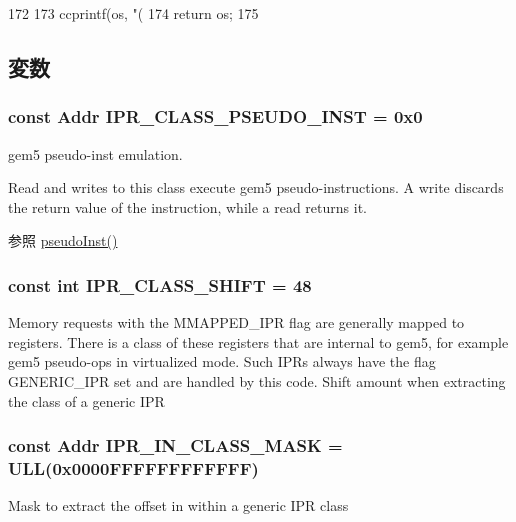 \begin{DoxyCode}
172 {
173     ccprintf(os, "(%
174     return os;
175 }
\end{DoxyCode}


\subsection{変数}
\hypertarget{namespaceGenericISA_a7691200ba0d3fea3d1bfdc555efb9b76}{
\subsubsection[{IPR\_\-CLASS\_\-PSEUDO\_\-INST}]{\setlength{\rightskip}{0pt plus 5cm}const {\bf Addr} {\bf IPR\_\-CLASS\_\-PSEUDO\_\-INST} = 0x0}}
\label{namespaceGenericISA_a7691200ba0d3fea3d1bfdc555efb9b76}
gem5 pseudo-\/inst emulation.

Read and writes to this class execute gem5 pseudo-\/instructions. A write discards the return value of the instruction, while a read returns it.

\begin{DoxySeeAlso}{参照}
\hyperlink{namespacePseudoInst_a469ba8e314952a0076e086dee22ea6de}{pseudoInst()} 
\end{DoxySeeAlso}
\hypertarget{namespaceGenericISA_aeb17d164394fbbccc6ef6992f36e9a74}{
\subsubsection[{IPR\_\-CLASS\_\-SHIFT}]{\setlength{\rightskip}{0pt plus 5cm}const int {\bf IPR\_\-CLASS\_\-SHIFT} = 48}}
\label{namespaceGenericISA_aeb17d164394fbbccc6ef6992f36e9a74}
Memory requests with the MMAPPED\_\-IPR flag are generally mapped to registers. There is a class of these registers that are internal to gem5, for example gem5 pseudo-\/ops in virtualized mode. Such IPRs always have the flag GENERIC\_\-IPR set and are handled by this code. Shift amount when extracting the class of a generic IPR \hypertarget{namespaceGenericISA_ada17fbe3666ca6de3621618e5abf7791}{
\subsubsection[{IPR\_\-IN\_\-CLASS\_\-MASK}]{\setlength{\rightskip}{0pt plus 5cm}const {\bf Addr} {\bf IPR\_\-IN\_\-CLASS\_\-MASK} = ULL(0x0000FFFFFFFFFFFF)}}
\label{namespaceGenericISA_ada17fbe3666ca6de3621618e5abf7791}
Mask to extract the offset in within a generic IPR class 